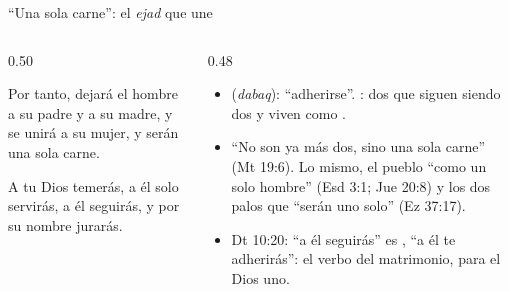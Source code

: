 \begin{frame}{``Una sola carne'': el \emph{ejad} que une}
\begin{columns}[t,onlytextwidth]
\begin{column}{0.50\textwidth}
\begin{center}\small{}\end{center}
\begin{cita}[fontupper=\scriptsize\itshape]Por tanto, dejará el hombre a su padre y a su madre, y se unirá a su mujer, y serán una sola carne.\end{cita}
\begin{cita}[fontupper=\scriptsize\itshape]A \SENOR{} tu Dios temerás, a él solo servirás, a él seguirás, y por su nombre jurarás.\end{cita}
\end{column}
\begin{column}{0.48\textwidth}\small
\begin{itemize}
\item {} (\emph{dabaq}): ``adherirse''. : dos que siguen siendo dos y viven como .
\item ``No son ya más dos, sino una sola carne'' (Mt 19:6). Lo mismo, el pueblo ``como un solo hombre'' (Esd 3:1; Jue 20:8) y los dos palos que ``serán uno solo'' (Ez 37:17).
\item Dt 10:20: ``a él seguirás'' es , ``a él te adherirás'': el verbo del matrimonio, para el Dios uno.
\end{itemize}
\end{column}
\end{columns}\par\smallskip
{}
\end{frame}

